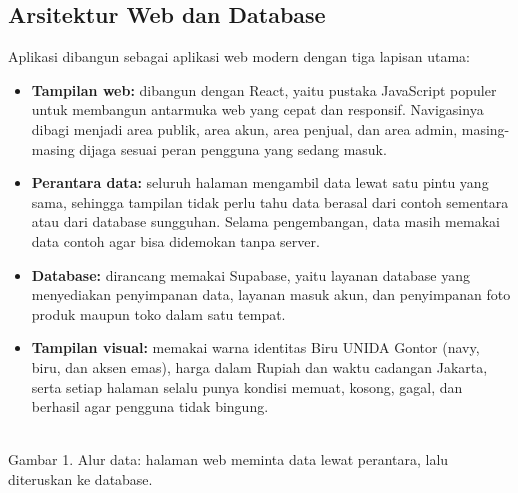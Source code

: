 \documentclass[11pt, a4paper]{article}
\begin{document}
\subsection{Arsitektur Web dan Database}

Aplikasi dibangun sebagai aplikasi web modern dengan tiga lapisan utama:

\begin{itemize}
  \item \textbf{Tampilan web:} dibangun dengan React, yaitu pustaka JavaScript populer untuk membangun antarmuka web yang cepat dan responsif. Navigasinya dibagi menjadi area publik, area akun, area penjual, dan area admin, masing-masing dijaga sesuai peran pengguna yang sedang masuk.
  \item \textbf{Perantara data:} seluruh halaman mengambil data lewat satu pintu yang sama, sehingga tampilan tidak perlu tahu data berasal dari contoh sementara atau dari database sungguhan. Selama pengembangan, data masih memakai data contoh agar bisa didemokan tanpa server.
  \item \textbf{Database:} dirancang memakai Supabase, yaitu layanan database yang menyediakan penyimpanan data, layanan masuk akun, dan penyimpanan foto produk maupun toko dalam satu tempat.
  \item \textbf{Tampilan visual:} memakai warna identitas Biru UNIDA Gontor (navy, biru, dan aksen emas), harga dalam Rupiah dan waktu cadangan Jakarta, serta setiap halaman selalu punya kondisi memuat, kosong, gagal, dan berhasil agar pengguna tidak bingung.
\end{itemize}

\begin{center}
\\[0.1cm]
{\scriptsize\textcolor{unidagray}{Gambar 1. Alur data: halaman web meminta data lewat perantara, lalu diteruskan ke database.}}
\end{center}
\end{document}

